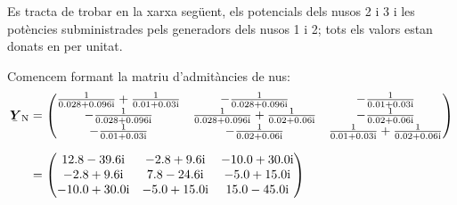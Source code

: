 \begin{exemple}\label{ex:FluxCarrXarxa}
	\addcontentsxms{\FluxCarrXarxa}
    Es tracta de trobar en la xarxa següent, els potencials dels nusos 2
    i 3 i les potències subministrades pels generadors dels nusos 1 i 2;
    tots els valors estan donats en per unitat.
    \begin{center}
        
    \end{center}

    Comencem formant la matriu d'admitàncies de nus:
    \begin{align*}
    \mcmplx{Y}\ped{N} &= \begin{pmatrix}
    \frac{1}{\complexnum{0,028+j0,096}} + \frac{1}{\complexnum{0,01+j0,03}} & -\frac{1}{\complexnum{0,028+j0,096}}  &  -\frac{1}{\complexnum{0,01+j0,03}}\\
    -\frac{1}{\complexnum{0,028+j0,096}} & \frac{1}{\complexnum{0,028+j0,096}} + \frac{1}{\complexnum{0,02+j0,06}} &  -\frac{1}{\complexnum{0,02+j0,06}}\\
    -\frac{1}{\complexnum{0,01+j0,03}} & -\frac{1}{\complexnum{0,02+j0,06}} &
    \frac{1}{\complexnum{0,01+j0,03}} + \frac{1}{\complexnum{0,02+j0,06}}
    \end{pmatrix}  \\[1.5ex]
     &= \begin{pmatrix}
    \complexnum{12,8 - j 39,6} & \complexnum{-2,8 + j 9,6} & \complexnum{-10,0 + j 30,0} \\
    \complexnum{-2,8 + j 9,6} & \complexnum{7,8 - j 24,6} & \complexnum{-5,0 + j 15,0} \\
    \complexnum{-10,0 + j 30,0} & \complexnum{-5,0 + j 15,0} & \complexnum{15,0 - j 45,0}
    \end{pmatrix}
    \end{align*}


\end{exemple}
